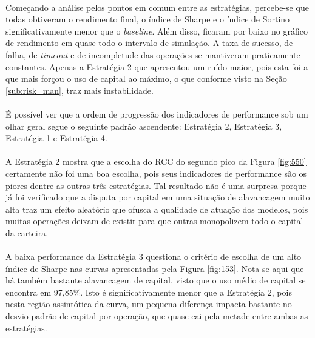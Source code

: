 \paragraph{} Começando a análise pelos pontos em comum entre as estratégias, percebe-se que todas obtiveram o rendimento final, o índice de Sharpe e o índice de Sortino significativamente menor que o \textit{baseline}. Além disso, ficaram por baixo no gráfico de rendimento em quase todo o intervalo de simulação. A taxa de sucesso, de falha, de \textit{timeout} e de incompletude das operações se mantiveram praticamente constantes. Apenas a Estratégia 2 que apresentou um ruído maior, pois esta foi a que mais forçou o uso de capital ao máximo, o que conforme visto na Seção \ref{sub:risk_man}, traz mais instabilidade.

\paragraph{} É possível ver que a ordem de progressão dos indicadores de performance sob um olhar geral segue o seguinte padrão ascendente: Estratégia 2, Estratégia 3, Estratégia 1 e Estratégia 4.

\paragraph{} A Estratégia 2 mostra que a escolha do RCC do segundo pico da Figura \ref{fig:550} certamente não foi uma boa escolha, pois seus indicadores de performance são os piores dentre as outras três estratégias. Tal resultado não é uma surpresa porque já foi verificado que a disputa por capital em uma situação de alavancagem muito alta traz um efeito aleatório que ofusca a qualidade de atuação dos modelos, pois muitas operações deixam de existir para que outras monopolizem todo o capital da carteira.

\paragraph{} A baixa performance da Estratégia 3 questiona o critério de escolha de um alto índice de Sharpe nas curvas apresentadas pela Figura \ref{fig:153}. Nota-se aqui que há também bastante alavancagem de capital, visto que o uso médio de capital se encontra em 97,85\%. Isto é significativamente menor que a Estratégia 2, pois nesta região assintótica da curva, um pequena diferença impacta bastante no desvio padrão de capital por operação, que quase cai pela metade entre ambas as estratégias.

